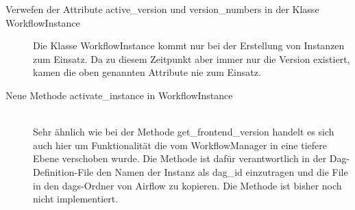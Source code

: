 \begin{description}
\item[Verwefen der Attribute active\_version und version\_numbers in der Klasse WorkflowInstance] \hfill
Die Klasse WorkflowInstance kommt nur bei der Erstellung von Instanzen zum Einsatz. Da zu diesem Zeitpunkt aber immer nur die Version \grqq{} existiert, kamen die oben genannten Attribute nie zum Einsatz.
\item[Neue Methode activate\_instance in WorkflowInstance]\hfill \\
Sehr ähnlich wie bei der Methode get\_frontend\_version handelt es sich auch hier um Funktionalität die vom WorkflowManager in eine tiefere Ebene verschoben wurde. Die Methode ist dafür verantwortlich in der Dag-Definition-File den Namen der Instanz als dag\_id einzutragen und die File in den \glqq dags\grqq{}-Ordner von Airflow zu kopieren. Die Methode ist bisher noch nicht implementiert.
\end{description}